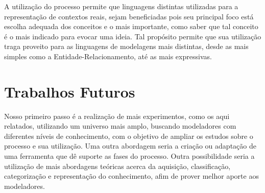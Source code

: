 A utilização do processo permite que linguagens distintas utilizadas para a representação de contextos reais, sejam beneficiadas pois seu principal foco está escolha adequada dos conceitos e o mais importante, como saber que tal conceito é o mais indicado para evocar uma ideia. Tal propósito permite que sua utilização traga proveito para as linguagens de modelagens mais distintas, desde as mais simples como a Entidade-Relacionamento, até as mais expressivas. 

\section{\hspace*{3pt} Trabalhos Futuros}
\label{sec:trabalhosFuturos}

Nosso primeiro passo é a realização de mais experimentos, como os aqui relatados, utilizando um universo mais amplo, buscando modeladores com diferentes níveis de conhecimento, com o objetivo de ampliar os estudos sobre o processo e sua utilização. Uma outra abordagem seria a criação ou adaptação de uma ferramenta que dê suporte as fases do processo. Outra possibilidade seria a utilização de mais abordagens teóricas acerca da aquisição, classificação, categorização e representação do conhecimento, afim de prover melhor aporte aos modeladores.